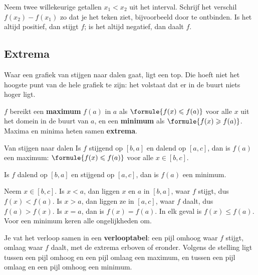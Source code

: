 \begin{werkwijze}
Neem twee willekeurige getallen $x_1 < x_2$ uit het interval. Schrijf het verschil $f(x_2) - f(x_1)$ zo dat je het teken ziet, bijvoorbeeld door te ontbinden. Is het altijd positief, dan stijgt $f$; is het altijd negatief, dan daalt $f$.
\end{werkwijze}


\begin{oefeningen}
\end{oefeningen}

\subsection{Extrema}

Waar een grafiek van stijgen naar dalen gaat, ligt een top. Die hoeft niet het hoogste punt van de hele grafiek te zijn: het volstaat dat er in de buurt niets hoger ligt.

\begin{theorie}
$f$ bereikt een \textbf{\textcolor{accent}{maximum}} $f(a)$ in $a$ als $\formule{f(x) \leqslant f(a)}$ voor alle $x$ uit het domein in de buurt van $a$, en een \textbf{\textcolor{accent}{minimum}} als $\formule{f(x) \geqslant f(a)}$. Maxima en minima heten samen \textbf{\textcolor{accent}{extrema}}.

\begin{stelling}{Van stijgen naar dalen}
Is $f$ stijgend op $[b, a]$ en dalend op $[a, c]$, dan is $f(a)$ een maximum: $\formule{f(x) \leqslant f(a)}$ voor alle $x \in [b, c]$.

Is $f$ dalend op $[b, a]$ en stijgend op $[a, c]$, dan is $f(a)$ een minimum.
\end{stelling}

\begin{bewijs}
Neem $x \in [b, c]$. Is $x < a$, dan liggen $x$ en $a$ in $[b, a]$, waar $f$ stijgt, dus $f(x) < f(a)$. Is $x > a$, dan liggen ze in $[a, c]$, waar $f$ daalt, dus $f(a) > f(x)$. Is $x = a$, dan is $f(x) = f(a)$. In elk geval is $f(x) \leqslant f(a)$. Voor een minimum keren alle ongelijkheden om.
\end{bewijs}
\end{theorie}

Je vat het verloop samen in een \textbf{verlooptabel}: een pijl omhoog waar $f$ stijgt, omlaag waar $f$ daalt, met de extrema erboven of eronder. Volgens de stelling ligt tussen een pijl omhoog en een pijl omlaag een maximum, en tussen een pijl omlaag en een pijl omhoog een minimum.

